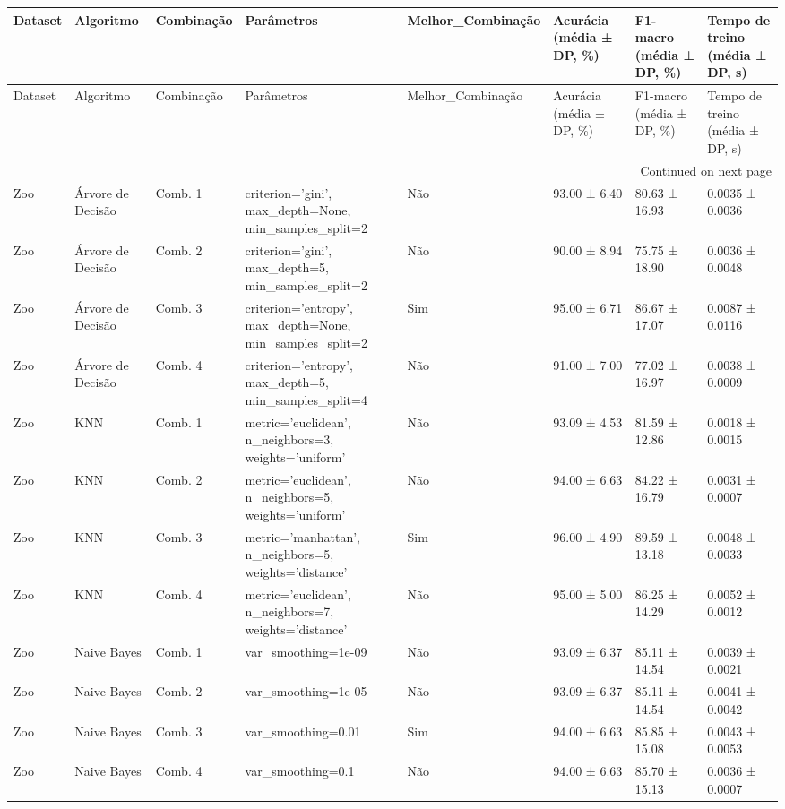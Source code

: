 \begin{longtable}{llllllll}
\toprule
Dataset & Algoritmo & Combinação & Parâmetros & Melhor\_Combinação & Acurácia (média ± DP, \%) & F1-macro (média ± DP, \%) & Tempo de treino (média ± DP, s) \\
\midrule
\endfirsthead
\toprule
Dataset & Algoritmo & Combinação & Parâmetros & Melhor\_Combinação & Acurácia (média ± DP, \%) & F1-macro (média ± DP, \%) & Tempo de treino (média ± DP, s) \\
\midrule
\endhead
\midrule
\multicolumn{8}{r}{Continued on next page} \\
\midrule
\endfoot
\bottomrule
\endlastfoot
Zoo & Árvore de Decisão & Comb. 1 & criterion='gini', max\_depth=None, min\_samples\_split=2 & Não & 93.00 ± 6.40 & 80.63 ± 16.93 & 0.0035 ± 0.0036 \\
Zoo & Árvore de Decisão & Comb. 2 & criterion='gini', max\_depth=5, min\_samples\_split=2 & Não & 90.00 ± 8.94 & 75.75 ± 18.90 & 0.0036 ± 0.0048 \\
Zoo & Árvore de Decisão & Comb. 3 & criterion='entropy', max\_depth=None, min\_samples\_split=2 & Sim & 95.00 ± 6.71 & 86.67 ± 17.07 & 0.0087 ± 0.0116 \\
Zoo & Árvore de Decisão & Comb. 4 & criterion='entropy', max\_depth=5, min\_samples\_split=4 & Não & 91.00 ± 7.00 & 77.02 ± 16.97 & 0.0038 ± 0.0009 \\
Zoo & KNN & Comb. 1 & metric='euclidean', n\_neighbors=3, weights='uniform' & Não & 93.09 ± 4.53 & 81.59 ± 12.86 & 0.0018 ± 0.0015 \\
Zoo & KNN & Comb. 2 & metric='euclidean', n\_neighbors=5, weights='uniform' & Não & 94.00 ± 6.63 & 84.22 ± 16.79 & 0.0031 ± 0.0007 \\
Zoo & KNN & Comb. 3 & metric='manhattan', n\_neighbors=5, weights='distance' & Sim & 96.00 ± 4.90 & 89.59 ± 13.18 & 0.0048 ± 0.0033 \\
Zoo & KNN & Comb. 4 & metric='euclidean', n\_neighbors=7, weights='distance' & Não & 95.00 ± 5.00 & 86.25 ± 14.29 & 0.0052 ± 0.0012 \\
Zoo & Naive Bayes & Comb. 1 & var\_smoothing=1e-09 & Não & 93.09 ± 6.37 & 85.11 ± 14.54 & 0.0039 ± 0.0021 \\
Zoo & Naive Bayes & Comb. 2 & var\_smoothing=1e-05 & Não & 93.09 ± 6.37 & 85.11 ± 14.54 & 0.0041 ± 0.0042 \\
Zoo & Naive Bayes & Comb. 3 & var\_smoothing=0.01 & Sim & 94.00 ± 6.63 & 85.85 ± 15.08 & 0.0043 ± 0.0053 \\
Zoo & Naive Bayes & Comb. 4 & var\_smoothing=0.1 & Não & 94.00 ± 6.63 & 85.70 ± 15.13 & 0.0036 ± 0.0007 \\

\end{longtable}
